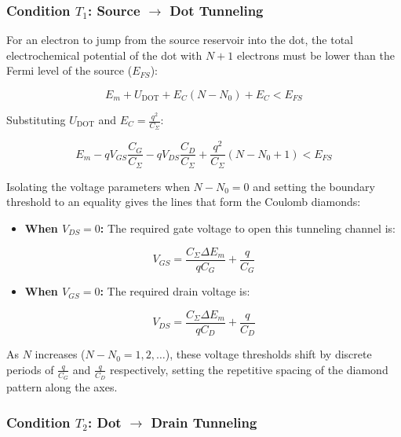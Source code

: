 \documentclass[
]{article}
\providecommand{\tightlist}{%
  \setlength{\itemsep}{0pt}\setlength{\parskip}{0pt}}
\begin{document}
\subsubsection{\texorpdfstring{Condition \(T_1\): Source \(\rightarrow\)
Dot
Tunneling}{Condition T\_1: Source \textbackslash rightarrow Dot Tunneling}}\label{condition-t_1-source-rightarrow-dot-tunneling}

For an electron to jump from the source reservoir into the dot, the
total electrochemical potential of the dot with \(N+1\) electrons must
be lower than the Fermi level of the source (\(E_{FS}\)):

\[E_m + U_{\text{DOT}} + E_C(N - N_0) + E_C < E_{FS}\]

Substituting \(U_{\text{DOT}}\) and \(E_C = \frac{q^2}{C_{\Sigma}}\):

\[E_m - q V_{GS}\frac{C_G}{C_{\Sigma}} - q V_{DS}\frac{C_D}{C_{\Sigma}} + \frac{q^2}{C_{\Sigma}}(N - N_0 + 1) < E_{FS}\]

Isolating the voltage parameters when \(N - N_0 = 0\) and setting the
boundary threshold to an equality gives the lines that form the Coulomb
diamonds:

\begin{itemize}
\tightlist
\item
  \textbf{When \(V_{DS} = 0\):} The required gate voltage to open this
  tunneling channel is:
\end{itemize}

\[V_{GS} = \frac{C_{\Sigma}\Delta E_m}{q C_G} + \frac{q}{C_G}\]

\begin{itemize}
\tightlist
\item
  \textbf{When \(V_{GS} = 0\):} The required drain voltage is:
\end{itemize}

\[V_{DS} = \frac{C_{\Sigma}\Delta E_m}{q C_D} + \frac{q}{C_D}\]

As \(N\) increases (\(N-N_0 = 1, 2, \dots\)), these voltage thresholds
shift by discrete periods of \(\frac{q}{C_G}\) and \(\frac{q}{C_D}\)
respectively, setting the repetitive spacing of the diamond pattern
along the axes.

\subsubsection{\texorpdfstring{Condition \(T_2\): Dot \(\rightarrow\)
Drain
Tunneling}{Condition T\_2: Dot \textbackslash rightarrow Drain Tunneling}}\label{condition-t_2-dot-rightarrow-drain-tunneling}
\end{document}
